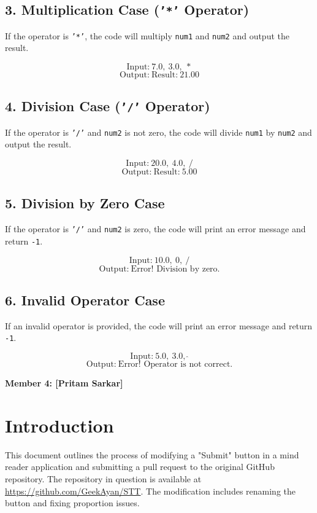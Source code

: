 \documentclass{article}
\begin{document}
\subsection{3. Multiplication Case (\texttt{'*'} Operator)}
If the operator is \texttt{'*'}, the code will multiply \texttt{num1} and \texttt{num2} and output the result.

\[
\text{Input:} \ 7.0, \ 3.0, \ *
\]
\[
\text{Output:} \ \text{Result:} \ 21.00
\]

\subsection{4. Division Case (\texttt{'/'} Operator)}
If the operator is \texttt{'/'} and \texttt{num2} is not zero, the code will divide \texttt{num1} by \texttt{num2} and output the result.

\[
\text{Input:} \ 20.0, \ 4.0, \ /
\]
\[
\text{Output:} \ \text{Result:} \ 5.00
\]

\subsection{5. Division by Zero Case}
If the operator is \texttt{'/'} and \texttt{num2} is zero, the code will print an error message and return \texttt{-1}.

\[
\text{Input:} \ 10.0, \ 0, \ /
\]
\[
\text{Output:} \ \text{Error! Division by zero.}
\]

\subsection{6. Invalid Operator Case}
If an invalid operator is provided, the code will print an error message and return \texttt{-1}.

\[
\text{Input:} \ 5.0, \ 3.0, \ \hat{ } 
\]
\[
\text{Output:} \ \text{Error! Operator is not correct.}
\]
\vspace{10in}
\begin{center}
    \textbf{\LARGE{{Member 4: [Pritam Sarkar]}}}
\end{center}
\section{Introduction}
This document outlines the process of modifying a "Submit" button in a mind reader application and submitting a pull request to the original GitHub repository. The repository in question is available at \url{https://github.com/GeekAyan/STT}. The modification includes renaming the button and fixing proportion issues.
\end{document}
